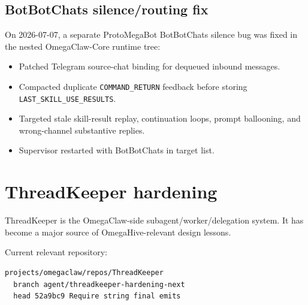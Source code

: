 \documentclass[11pt]{article}
\begin{document}
\subsection{BotBotChats silence/routing fix}

On 2026-07-07, a separate ProtoMegaBot BotBotChats silence bug was fixed in the nested OmegaClaw-Core runtime tree:
\begin{itemize}
  \item Patched Telegram source-chat binding for dequeued inbound messages.
  \item Compacted duplicate \texttt{COMMAND\_RETURN} feedback before storing \texttt{LAST\_SKILL\_USE\_RESULTS}.
  \item Targeted stale skill-result replay, continuation loops, prompt ballooning, and wrong-channel substantive replies.
  \item Supervisor restarted with BotBotChats in target list.
\end{itemize}

\section{ThreadKeeper hardening}\label{sec:threadkeeper}

ThreadKeeper is the OmegaClaw-side subagent/worker/delegation system.  It has become a major source of OmegaHive-relevant design lessons.

Current relevant repository:
\begin{verbatim}
projects/omegaclaw/repos/ThreadKeeper
  branch agent/threadkeeper-hardening-next
  head 52a9bc9 Require string final emits
\end{verbatim}
\end{document}
